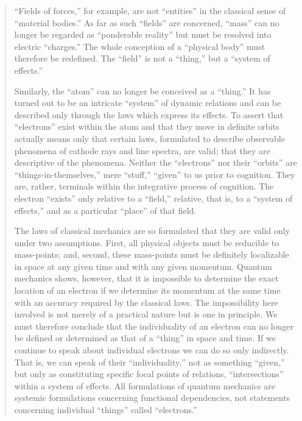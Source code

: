 \begin{quote}
    ``Fields of forces,'' for example, are not ``entities'' in the classical sense of ``material bodies.''  As far as such ``fields'' are concerned, ``mass'' can no longer be regarded as ``ponderable reality'' but must be resolved into electric ``charges.''  The whole conception of a ``physical body'' must therefore be redefined.  The ``field'' is not a ``thing,'' but a ``system of effects.''

    Similarly, the ``atom'' can no longer be conceived as a ``thing.''  It has turned out to be an intricate ``system'' of dynamic relations and can be described only through the laws which express its effects.  To assert that ``electrons'' exist within the atom and that they move in definite orbits actually means only that certain laws, formulated to describe observable phenomena of cathode rays and line spectra, are valid; that they are descriptive of the phenomena.  Neither the ``electrons'' nor their ``orbits'' are ``things-in-themselves,'' mere ``stuff,'' ``given'' to us prior to cognition.  They are, rather, terminals within the integrative process of cognition.  The electron ``exists'' only relative to a ``field,'' relative, that is, to a ``system of effects,'' and as a particular ``place'' of that field.  

    The laws of classical mechanics are so formulated that they are valid only under two assumptions.  First, all physical objects must be reducible to mass-points; and, second, these mass-points must be definitely localizable in space at any given time and with any given momentum.  Quantum mechanics shows, however, that it is impossible to determine the exact location of an electron if we determine its momentum at the same time with an accuracy required by the classical laws.  The impossibility here involved is not merely of a practical nature but is one in principle.  We must therefore conclude that the individuality of an electron can no longer be defined or determined as that of a ``thing'' in space and time.  If we continue to speak about individual electrons we can do so only indirectly.  That is, we can speak of their ``individuality,'' not as something ``given,'' but only as constituting specific focal points of relations, ``intersections'' within a system of effects.  All formulations of quantum mechanics are systemic formulations concerning functional dependencies, not statements concerning individual ``things'' called ``electrons.''  \citep[p. 773-776]{WerkmeisterCassirer}
\end{quote}


